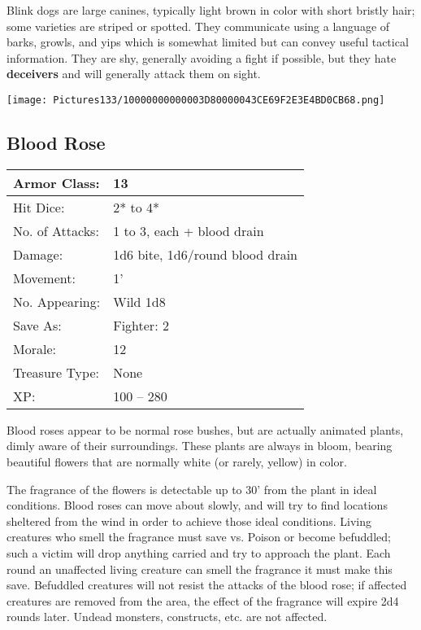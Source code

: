 \documentclass[a4paper,twoside,openany,10pt]{book}
\begin{document}
\begin{multicols}{2}
Blink dogs are large canines, typically light brown in color with short bristly hair; some varieties are striped or spotted. They communicate using a language of barks, growls, and yips which is somewhat limited but can convey useful tactical information. They are shy, generally avoiding a fight if possible, but they hate \textbf{deceivers} and will generally attack them on sight.


\begin{center}
	\texttt{[image: Pictures133/10000000000003D80000043CE69F2E3E4BD0CB68.png]}
\end{center}

\subsection*{Blood Rose}\label{blood-rose}

\begin{tabularx}{0.48\textwidth}{@{}lX@{}}
	Armor Class: & 13 \\\hline
Hit Dice: & 2* to 4* \\\hline
No. of Attacks: & 1 to 3, each + blood drain \\\hline
Damage: & 1d6 bite, 1d6/round blood drain \\\hline
Movement: & 1' \\\hline
No. Appearing: & Wild 1d8 \\\hline
Save As: & Fighter: 2 \\\hline
Morale: & 12 \\\hline
Treasure Type: & None \\\hline
XP: & 100 -- 280 \\\hline
\end{tabularx}\medskip

Blood roses appear to be normal rose bushes, but are actually animated plants, dimly aware of their surroundings. These plants are always in bloom, bearing beautiful flowers that are normally white (or rarely, yellow) in color.

The fragrance of the flowers is detectable up to 30' from the plant in ideal conditions. Blood roses can move about slowly, and will try to find locations sheltered from the wind in order to achieve those ideal conditions. Living creatures who smell the fragrance must save vs. Poison or become befuddled; such a victim will drop anything carried and try to approach the plant. Each round an unaffected living creature can smell the fragrance it must make this save. Befuddled creatures will not resist the attacks of the blood rose; if affected creatures are removed from the area, the effect of the fragrance will expire 2d4 rounds later. Undead monsters, constructs, etc. are not affected.


\end{multicols}
\end{document}
